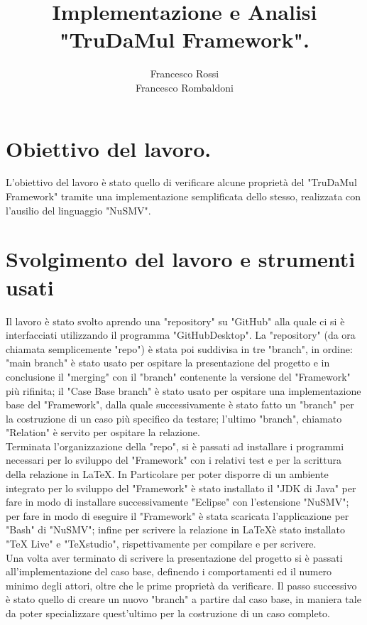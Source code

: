 \documentclass[13pt,a4paper]{article}
\title{ Implementazione  e Analisi "TruDaMul Framework".}
\author{Francesco Rossi \\
				Francesco Rombaldoni}
\date{}
\begin{document}
	\maketitle
	\newpage
	
	\newpage
	
	\section{Obiettivo del  lavoro.}
	L'obiettivo del lavoro è stato quello di verificare alcune proprietà del "TruDaMul Framework" tramite una implementazione semplificata dello stesso, realizzata con l'ausilio del linguaggio "NuSMV".\\
	
	\section{Svolgimento del lavoro e strumenti usati}
	Il lavoro è stato svolto aprendo una "repository" su "GitHub" alla quale ci si è interfacciati utilizzando il programma "GitHubDesktop". La "repository" (da ora chiamata semplicemente "repo") è stata poi suddivisa in tre "branch", in ordine: "main branch" è stato usato per ospitare la presentazione del progetto e in conclusione il "merging" con il "branch" contenente la versione del "Framework" più rifinita; il "Case Base branch" è stato usato per ospitare una implementazione base del "Framework", dalla quale successivamente è stato fatto un "branch" per la costruzione di un caso più specifico da testare; l'ultimo "branch", chiamato "Relation" è servito per ospitare la relazione. \bigskip \\
	Terminata l'organizzazione della "repo", si è passati ad installare i programmi necessari per lo sviluppo del "Framework" con i relativi test e per la scrittura della relazione in \LaTeX. In Particolare per poter disporre di un ambiente integrato per lo sviluppo del "Framework" è stato installato il "JDK di Java" per fare in modo di installare successivamente "Eclipse" con l'estensione "NuSMV"; per fare in modo di eseguire il "Framework" è stata scaricata l'applicazione per "Bash" di "NuSMV"; infine per scrivere la relazione in \LaTeX è stato installato "TeX Live" e "TeXstudio", rispettivamente per compilare e per scrivere.\\
	Una volta aver terminato di scrivere la presentazione del progetto si è passati all'implementazione  del caso base, definendo i comportamenti ed il numero minimo degli attori, oltre che le prime proprietà da verificare. Il passo successivo è stato quello di creare un nuovo "branch" a partire dal caso base, in maniera tale da poter specializzare quest'ultimo per la costruzione di un caso completo.\\
	
\end{document}
